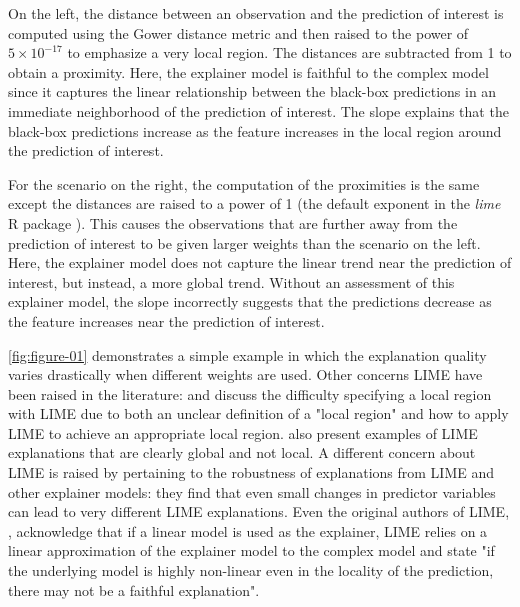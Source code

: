 \documentclass[AMS,STIX2COL]{WileyNJD-v2}\usepackage[]{graphicx}\usepackage[]{color}
\renewcommand{\sout}[1]{\unskip}
\begin{document}
On the left, the distance between an observation and the prediction of interest is computed using the Gower distance metric \citep{gower:1971} and then raised to the power of \ensuremath{5\times 10^{-17}} to emphasize a very local region. The distances are subtracted from 1 to obtain a proximity. Here, the explainer model is faithful to the complex model since it captures the linear relationship between the black-box predictions in an immediate neighborhood of the prediction of interest. The slope explains that the black-box predictions increase as the feature increases in the local region around the prediction of interest.

For the scenario on the right, the computation of the proximities is the same except the distances are raised to a power of 1 (the default exponent in the \emph{lime} R package \citep{pedersen:2020}). This causes the observations that are further away from the prediction of interest to be given larger weights than the scenario on the left. Here, the explainer model does not capture the linear trend near the prediction of interest, but instead, \sout{the explainer captures} a more global trend. Without an assessment of this explainer model, the slope incorrectly suggests that the predictions decrease as the feature increases near the prediction of interest.

\autoref{fig:figure-01} demonstrates a simple example in which the explanation quality varies drastically when different weights are used. Other concerns \sout{with} LIME have been raised in the literature: \citet{laugel:2018} and \citet{molnar:2019} discuss the difficulty specifying a local region with LIME due to both an unclear definition of \sout{what is} a "local region" and how to apply LIME to achieve an appropriate local region. \citet{laugel:2018} also present examples of LIME explanations that are clearly global and not local. A different concern about LIME is raised by \citet{alvarezmelis:2018} pertaining to the robustness of explanations from LIME and other explainer models: they find that even small changes in predictor variables can lead to very different LIME explanations. Even the original authors of LIME, \citet{ribeiro:2016}, acknowledge that if a linear model is used as the explainer, LIME relies on a linear approximation of the explainer model to the complex model and state "if the underlying model is highly non-linear even in the locality of the prediction, there may not be a faithful explanation".
\end{document}
